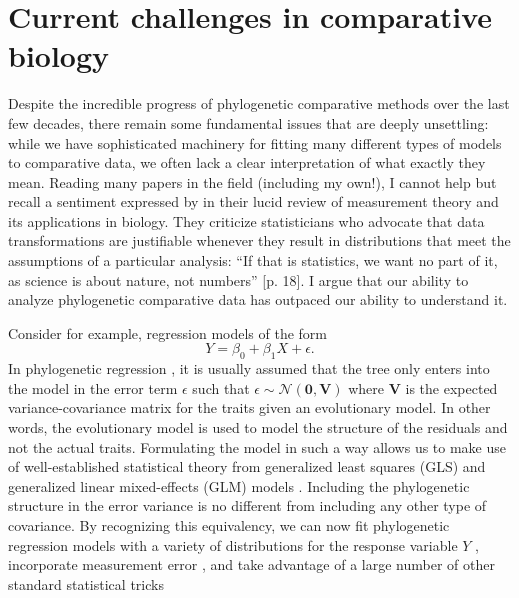 \section{Current challenges in comparative biology}

Despite the incredible progress of phylogenetic comparative methods over the last few decades, there remain some fundamental issues that are deeply unsettling: while we have sophisticated machinery for fitting many different types of models to comparative data, we often lack a clear interpretation of what exactly they mean. Reading many papers in the field (including my own!), I cannot help but recall a sentiment expressed by \citet{Houle2011} in their lucid review of measurement theory and its applications in biology. They criticize statisticians who advocate that data transformations are justifiable whenever they result in distributions that meet the assumptions of a particular analysis: ``If that is statistics, we want no part of it, as science is about nature, not numbers'' [p. 18]. I argue that our ability to analyze phylogenetic comparative data has outpaced our ability to understand it.

Consider for example, regression models of the form
\[Y=\beta_{\text{0}} + \beta_{\text{1}}X + \epsilon.\]
In phylogenetic regression \citep{Grafen1989, Lynch1991}, it is usually assumed that the tree only enters into the model in the error term $\epsilon$ such that $\epsilon \sim \mathcal{N}(\textbf{0}, \mathbf{V})$ where $\mathbf{V}$ is the expected variance-covariance matrix for the traits given an evolutionary model. In other words, the evolutionary model is used to model the structure of the residuals and not the actual traits. Formulating the model in such a way allows us to make use of well-established statistical theory from generalized least squares (GLS) and generalized linear mixed-effects (GLM) models \citep{Lynch1991, Rohlf2001, Rohlf2006, Housworth2004, Hadfield2010}. Including the phylogenetic structure in the error variance is no different from including any other type of covariance. By recognizing this equivalency, we can now fit phylogenetic regression models with a variety of distributions for the response variable $Y$ \citep{Ives2010, Hadfield2010}, incorporate measurement error \citep{Ives2007, Hansen2012SysBio}, and take advantage of a large number of other standard statistical tricks \citep[see][for a recent review]{PCM}

